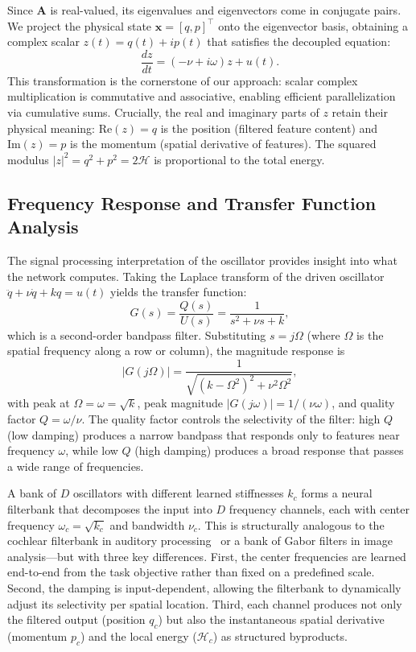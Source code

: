 \documentclass[11pt]{article}
\begin{document}
Since $\mathbf{A}$ is real-valued, its eigenvalues and eigenvectors come in conjugate pairs. We project the physical state $\mathbf{x} = [q, p]^\top$ onto the eigenvector basis, obtaining a complex scalar $z(t) = q(t) + ip(t)$ that satisfies the decoupled equation:
\begin{equation}
    \frac{dz}{dt} = (-\nu + i\omega)z + u(t).
    \label{eq:complex_ode}
\end{equation}
This transformation is the cornerstone of our approach: scalar complex multiplication is commutative and associative, enabling efficient parallelization via cumulative sums. Crucially, the real and imaginary parts of $z$ retain their physical meaning: $\text{Re}(z) = q$ is the position (filtered feature content) and $\text{Im}(z) = p$ is the momentum (spatial derivative of features). The squared modulus $|z|^2 = q^2 + p^2 = 2\mathcal{H}$ is proportional to the total energy.

\subsection{Frequency Response and Transfer Function Analysis}

The signal processing interpretation of the oscillator provides insight into what the network computes. Taking the Laplace transform of the driven oscillator $\ddot{q} + \nu\dot{q} + kq = u(t)$ yields the transfer function:
\begin{equation}
    G(s) = \frac{Q(s)}{U(s)} = \frac{1}{s^2 + \nu s + k},
    \label{eq:transfer}
\end{equation}
which is a second-order bandpass filter. Substituting $s = j\Omega$ (where $\Omega$ is the spatial frequency along a row or column), the magnitude response is
\begin{equation}
    |G(j\Omega)| = \frac{1}{\sqrt{(k - \Omega^2)^2 + \nu^2\Omega^2}},
    \label{eq:freq_response}
\end{equation}
with peak at $\Omega = \omega = \sqrt{k}$, peak magnitude $|G(j\omega)| = 1/(\nu\omega)$, and quality factor $Q = \omega/\nu$. The quality factor controls the selectivity of the filter: high $Q$ (low damping) produces a narrow bandpass that responds only to features near frequency $\omega$, while low $Q$ (high damping) produces a broad response that passes a wide range of frequencies.

A bank of $D$ oscillators with different learned stiffnesses $k_c$ forms a neural filterbank that decomposes the input into $D$ frequency channels, each with center frequency $\omega_c = \sqrt{k_c}$ and bandwidth $\nu_c$. This is structurally analogous to the cochlear filterbank in auditory processing~\cite{lyon2017human} or a bank of Gabor filters in image analysis---but with three key differences. First, the center frequencies are learned end-to-end from the task objective rather than fixed on a predefined scale. Second, the damping is input-dependent, allowing the filterbank to dynamically adjust its selectivity per spatial location. Third, each channel produces not only the filtered output (position $q_c$) but also the instantaneous spatial derivative (momentum $p_c$) and the local energy ($\mathcal{H}_c$) as structured byproducts.
\end{document}
